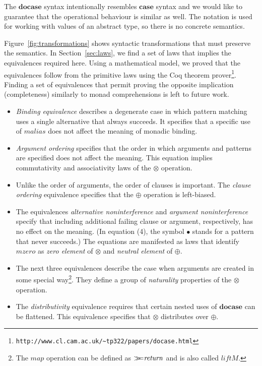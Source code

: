 \documentclass{sigplanconf}
\newcommand{\Varid}[1]{\mathit{#1}}
\newcommand{\bind}{\mathbin{>\!\!\!>\mkern-6.7mu=}}
\begin{document}
The \ensuremath{\mathbf{docase}} syntax intentionally resembles \ensuremath{\mathbf{case}} syntax and we would like to guarantee 
that the operational behaviour is similar as well. The notation is used for working with values of an 
abstract type, so there is no concrete semantics. 

Figure~\ref{fig:transformations} shows syntactic transformations that must preserve
the semantics. In Section~\ref{sec:laws}, we find a set of laws that implies the equivalences
required here. Using a mathematical model, we proved that the equivalences follow from the primitive
laws using the Coq theorem prover\footnote{\texttt{http://www.cl.cam.ac.uk/\textasciitilde tp322/papers/docase.html}}. 
Finding a set of equivalences that permit proving the opposite implication 
(completeness) similarly to monad comprehensions \cite{comprehendingmonads} is left to future work.

\begin{itemize}
\item \textit{Binding equivalence} describes a degenerate case in which pattern matching uses
  a single alternative that always succeeds. It specifies that a specific use of \ensuremath{\Varid{malias}}
  does not affect the meaning of monadic binding.
  
\item \textit{Argument ordering} specifies that the order in which arguments and patterns are
  specified does not affect the meaning. This equation implies commutativity and associativity 
  laws of the \ensuremath{\otimes} operation.

\item Unlike the order of arguments, the order of clauses is important. The
  \textit{clause ordering} equivalence specifies that the \ensuremath{\oplus} operation is left-biased.

\item The equivalences \textit{alternative noninterference} and \textit{argument noninterference}
  specify that including additional failing clause or argument, respectively, has no effect on the meaning. (In 
  equation (4), the symbol $\bullet$ stands for a pattern that never succeeds.) The equations are
  manifested as laws that identify \ensuremath{\Varid{mzero}} as \textit{zero element} of \ensuremath{\otimes} and \textit{neutral
  element} of \ensuremath{\oplus}.

\item The next three equivalences describe the case when arguments are created in some special 
  way\footnote{The \ensuremath{\Varid{map}} operation can be defined as \ensuremath{\bind \Varid{return}} and is also called \ensuremath{\Varid{liftM}}.}.
  They define a group of \textit{naturality} properties of the \ensuremath{\otimes} operation.

\item The \textit{distributivity} equivalence requires that certain nested uses of \ensuremath{\mathbf{docase}} can 
  be flattened. This equivalence specifies that \ensuremath{\otimes} distributes over \ensuremath{\oplus}.
\end{itemize}
\end{document}
